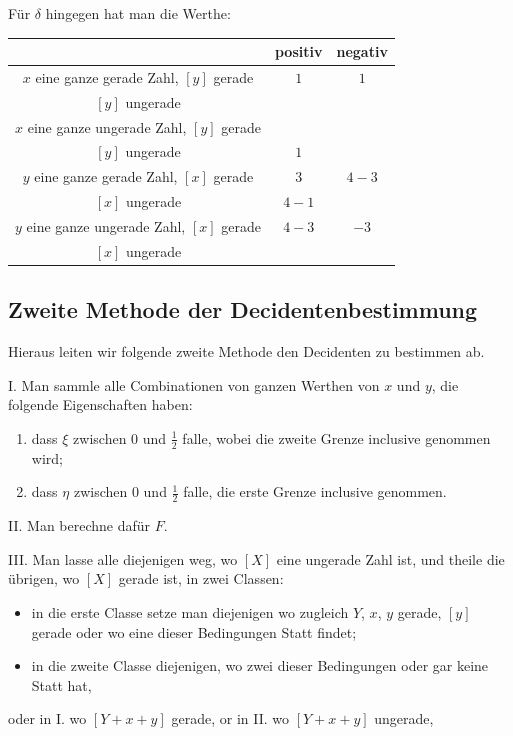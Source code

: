\documentclass[12pt,a4paper]{article}
\begin{document}
Für $\delta$ hingegen hat man die Werthe:
\begin{center}
\begin{tabular}{c|cc}
& positiv & negativ \\
\hline
$x$ eine ganze gerade Zahl, $[y]$ gerade & $1$ & $1$ \\
$[y]$ ungerade & & \\
$x$ eine ganze ungerade Zahl, $[y]$ gerade & & \\
$[y]$ ungerade & $1$ & \\
$y$ eine ganze gerade Zahl, $[x]$ gerade & $3$ & $4-3$ \\
$[x]$ ungerade & $4-1$ & \\
$y$ eine ganze ungerade Zahl, $[x]$ gerade & $4-3$ & $-3$ \\
$[x]$ ungerade & & \\
\end{tabular}
\end{center}

\subsection*{Zweite Methode der Decidentenbestimmung}

Hieraus leiten wir folgende zweite Methode den Decidenten zu bestimmen ab.

I. Man sammle alle Combinationen von ganzen Werthen von $x$ und $y$, die folgende Eigenschaften haben:
\begin{enumerate}
\item dass $\xi$ zwischen $0$ und $\frac{1}{2}$ falle, wobei die zweite Grenze inclusive genommen wird;
\item dass $\eta$ zwischen $0$ und $\frac{1}{2}$ falle, die erste Grenze inclusive genommen.
\end{enumerate}

II. Man berechne dafür $F$.

III. Man lasse alle diejenigen weg, wo $[X]$ eine ungerade Zahl ist, und theile die übrigen, wo $[X]$ gerade ist, in zwei Classen:
\begin{itemize}
\item in die erste Classe setze man diejenigen wo zugleich $Y$, $x$, $y$ gerade, $[y]$ gerade oder wo eine dieser Bedingungen Statt findet;
\item in die zweite Classe diejenigen, wo zwei dieser Bedingungen oder gar keine Statt hat,
\end{itemize}
oder in I. wo $[Y+x+y]$ gerade,
or in II. wo $[Y+x+y]$ ungerade,
\end{document}
